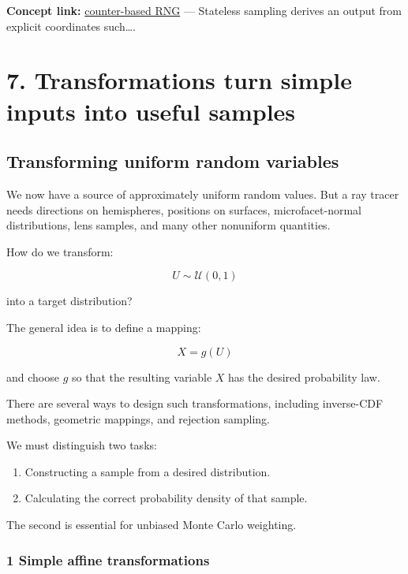 \textbf{Concept link:} \hyperref[02-foundations-ii-ch029-a-computer-produces-deterministic-pseudorandom-sequences]{counter-based RNG} --- Stateless sampling derives an output from explicit coordinates such\ldots.

\section{7. Transformations turn simple inputs into useful samples}\label{02-foundations-ii-ch029-transformations-turn-simple-inputs-into-useful-samples}

\subsection{Transforming uniform random variables}\label{02-foundations-ii-ch029-transforming-uniform-random-variables}

We now have a source of approximately uniform random values. But a ray tracer needs directions on hemispheres, positions on surfaces, microfacet-normal distributions, lens samples, and many other nonuniform quantities.

How do we transform:

\[
 U\sim\mathcal U(0,1)
\]

into a target distribution?

The general idea is to define a mapping:

\[
 \boxed{X=g(U)}
\]

and choose \(g\) so that the resulting variable \(X\) has the desired probability law.

There are several ways to design such transformations, including inverse-CDF methods, geometric mappings, and rejection sampling.

We must distinguish two tasks:

\begin{enumerate}
\def\labelenumi{\arabic{enumi}.}
\tightlist
\item
  Constructing a sample from a desired distribution.
\item
  Calculating the correct probability density of that sample.
\end{enumerate}

The second is essential for unbiased Monte Carlo weighting.

\subsubsection{1 Simple affine transformations}\label{02-foundations-ii-ch029-simple-affine-transformations}

